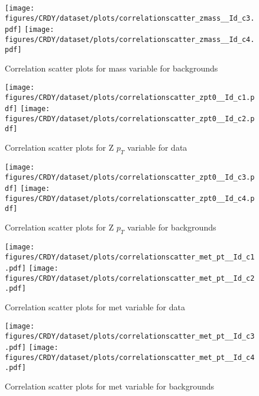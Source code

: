 \begin{figure}[!htb]%
\centering
\texttt{[image: figures/CRDY/dataset/plots/correlationscatter\_zmass\_\_Id\_c3.pdf]}
\texttt{[image: figures/CRDY/dataset/plots/correlationscatter\_zmass\_\_Id\_c4.pdf]}
\caption{ Correlation scatter plots for \Zll mass variable for backgrounds}%
\label{fig:correlations_CRDY_zmass_BG}                                                       
\end{figure}\clearpage



\begin{figure}[!htb]%
\centering
\texttt{[image: figures/CRDY/dataset/plots/correlationscatter\_zpt0\_\_Id\_c1.pdf]}
\texttt{[image: figures/CRDY/dataset/plots/correlationscatter\_zpt0\_\_Id\_c2.pdf]}
\caption{ Correlation scatter plots for Z $p_{T}$  variable for data}%
\label{fig:correlations_CRDY_zpt_S}                                                       
\end{figure}\clearpage



\begin{figure}[!htb]%
\centering
\texttt{[image: figures/CRDY/dataset/plots/correlationscatter\_zpt0\_\_Id\_c3.pdf]}
\texttt{[image: figures/CRDY/dataset/plots/correlationscatter\_zpt0\_\_Id\_c4.pdf]}
\caption{ Correlation scatter plots for Z $p_{T}$ variable for backgrounds}%
\label{fig:correlations_CRDY_zpt_BG}                                                       
\end{figure}\clearpage


\begin{figure}[!htb]%
\centering
\texttt{[image: figures/CRDY/dataset/plots/correlationscatter\_met\_pt\_\_Id\_c1.pdf]}
\texttt{[image: figures/CRDY/dataset/plots/correlationscatter\_met\_pt\_\_Id\_c2.pdf]}
\caption{ Correlation scatter plots for met variable for data}%
\label{fig:correlations_CRDY_met_pt_S}                                                       
\end{figure}\clearpage



\begin{figure}[!htb]%
\centering
\texttt{[image: figures/CRDY/dataset/plots/correlationscatter\_met\_pt\_\_Id\_c3.pdf]}
\texttt{[image: figures/CRDY/dataset/plots/correlationscatter\_met\_pt\_\_Id\_c4.pdf]}
\caption{ Correlation scatter plots for met variable for backgrounds}%
\label{fig:correlations_CRDY_met_pt_BG}                                                       
\end{figure}\clearpage





